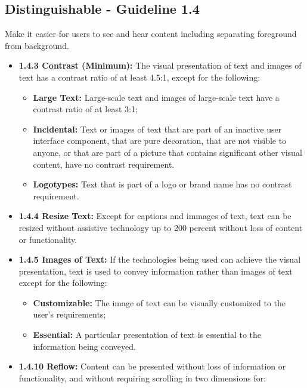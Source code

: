 \documentclass[
  letterpaper,
  DIV=11,
  numbers=noendperiod]{scrartcl}
\providecommand{\tightlist}{%
  \setlength{\itemsep}{0pt}\setlength{\parskip}{0pt}}\usepackage{longtable,booktabs,array}
\begin{document}
\subsection{Distinguishable - Guideline
1.4}\label{distinguishable---guideline-1.4}

Make it easier for users to see and hear content including separating
foreground from background.

\begin{itemize}
\item
  \textbf{1.4.3 Contrast (Minimum):} The visual presentation of text and
  images of text has a contrast ratio of at least 4.5:1, except for the
  following:

  \begin{itemize}
  \tightlist
  \item
    \textbf{Large Text:} Large-scale text and images of large-scale text
    have a contrast ratio of at least 3:1;
  \item
    \textbf{Incidental:} Text or images of text that are part of an
    inactive user interface component, that are pure decoration, that
    are not visible to anyone, or that are part of a picture that
    contains significant other visual content, have no contrast
    requirement.
  \item
    \textbf{Logotypes:} Text that is part of a logo or brand name has no
    contrast requirement.
  \end{itemize}
\item
  \textbf{1.4.4 Resize Text:} Except for captions and immages of text,
  text can be resized without assistive technology up to 200 percent
  without loss of content or functionality.
\item
  \textbf{1.4.5 Images of Text:} If the technologies being used can
  achieve the visual presentation, text is used to convey information
  rather than images of text except for the following:

  \begin{itemize}
  \tightlist
  \item
    \textbf{Customizable:} The image of text can be visually customized
    to the user's requirements;
  \item
    \textbf{Essential:} A particular presentation of text is essential
    to the information being conveyed.
  \end{itemize}
\item
  \textbf{1.4.10 Reflow:} Content can be presented without loss of
  information or functionality, and without requiring scrolling in two
  dimensions for:


\end{itemize}
\end{document}
